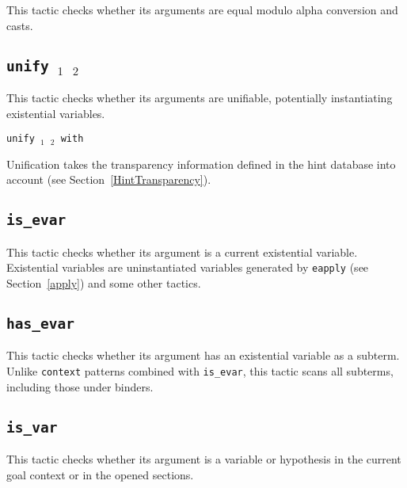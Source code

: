 \begin{coq_example*}
This tactic checks whether its arguments are equal modulo alpha conversion and casts.

\ErrMsg {}

\subsection{\tt unify \term$_1$ \term$_2$}
\label{unify}

This tactic checks whether its arguments are unifiable, potentially
instantiating existential variables.

\ErrMsg {}

\begin{Variants}
\item {\tt unify \term$_1$ \term$_2$ with \ident}

  Unification takes the transparency information defined in the
  hint database {\tt \ident} into account (see Section~\ref{HintTransparency}).
\end{Variants}

\subsection{\tt is\_evar \term}
\label{isevar}

This tactic checks whether its argument is a current existential
variable. Existential variables are uninstantiated variables generated
by {\tt eapply} (see Section~\ref{apply}) and some other tactics.

\ErrMsg {}

\subsection{\tt has\_evar \term}
\label{hasevar}

This tactic checks whether its argument has an existential variable as
a subterm.  Unlike {\tt context} patterns combined with {\tt is\_evar},
this tactic scans all subterms, including those under binders.

\ErrMsg {}

\subsection{\tt is\_var \term}
\label{isvar}

This tactic checks whether its argument is a variable or hypothesis in the
current goal context or in the opened sections.


\end{coq_example*}
